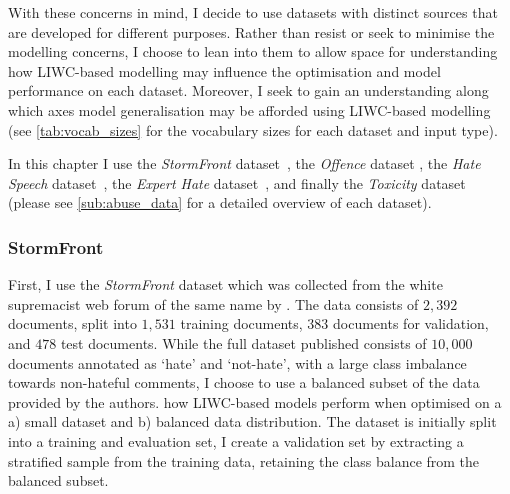 With these concerns in mind, I decide to use datasets with distinct sources that are developed for different purposes.
Rather than resist or seek to minimise the modelling concerns, I choose to lean into them to allow space for understanding how LIWC-based modelling may influence the optimisation and model performance on each dataset.
Moreover, I seek to gain an understanding along which axes model generalisation may be afforded using LIWC-based modelling (see \cref{tab:vocab_sizes} for the vocabulary sizes for each dataset and input type).

In this chapter I use the \textit{StormFront} dataset~\citep{Garcia:2019}, the \textit{Offence} dataset \citep{Davidson:2017}, the \textit{Hate Speech} dataset~\citep{Waseem-Hovy:2016}, the \textit{Expert Hate} dataset~\citep{Waseem:2016}, and finally the \textit{Toxicity} dataset~\citep{Wulczyn:2017} (please see \cref{sub:abuse_data} for a detailed overview of each dataset).

\subsubsection{StormFront}
First, I use the \textit{StormFront} dataset which was collected from the white supremacist web forum of the same name by \citet{Garcia:2019}.
The data consists of $2,392$ documents, split into $1,531$ training documents, $383$ documents for validation, and $478$ test documents.
While the full dataset published consists of $10,000$ documents annotated as `hate' and `not-hate', with a large class imbalance towards non-hateful comments, I choose to use a balanced subset of the data provided by the authors.
 how LIWC-based models perform when optimised on a a) small dataset and b) balanced data distribution.
The dataset is initially split into a training and evaluation set, I  create a validation set by extracting a stratified sample from the training data, retaining the class balance from the balanced subset.

